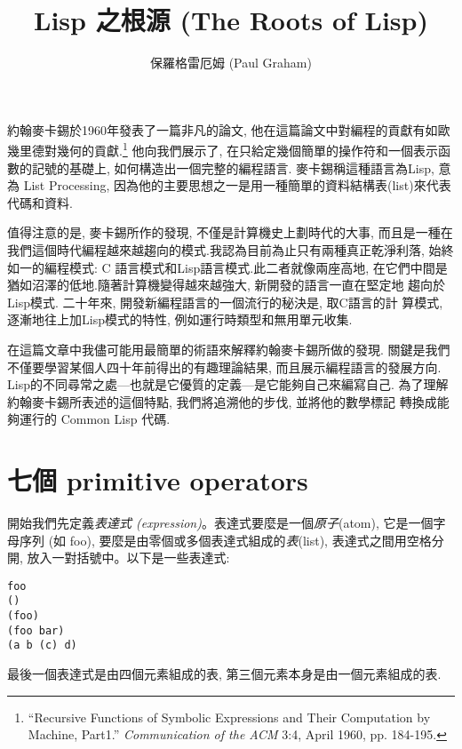 \documentclass[12pt]{article}
\begin{document}
 
\begin{CJK}{UTF8}{bsmi} %
\title{Lisp 之根源 (The Roots of Lisp)} 
\author{保羅格雷厄姆 (Paul Graham)} 
\maketitle 
\newcommand{\pone}{$p_{1}$} 
\newcommand{\pn}{$p_{n}$} 
\newcommand{\aone}{$a_{1}$} 
\newcommand{\an}{$a_{n}$} 
\newcommand{\vone}{$v_{1}$} 
\newcommand{\vn}{$v_{n}$} 
\newcommand{\eone}{$e_{1}$} 
\newcommand{\en}{$e_{n}$} 
約翰麥卡錫於1960年發表了一篇非凡的論文,
他在這篇論文中對編程的貢獻有如歐幾里德對幾何的貢獻.\footnote{``Recursive
Functions of Symbolic Expressions and Their Computation by Machine, Part1.'' 
{\it Communication of the ACM} 3:4, April 1960, pp. 184-195.} 
他向我們展示了, 在只給定幾個簡單的操作符和一個表示函數的記號的基礎上, 
如何構造出一個完整的編程語言. 
麥卡錫稱這種語言為Lisp, 
意為 
List 
Processing, 
因為他的主要思想之一是用一種簡單的資料結構表(list)來代表代碼和資料. 

值得注意的是, 麥卡錫所作的發現, 不僅是計算機史上劃時代的大事, 
而且是一種在我們這個時代編程越來越趨向的模式.我認為目前為止只有兩種真正乾淨利落, 
始終如一的編程模式: C 語言模式和Lisp語言模式.此二者就像兩座高地, 
在它們中間是猶如沼澤的低地.隨著計算機變得越來越強大, 新開發的語言一直在堅定地 
趨向於Lisp模式. 
二十年來, 開發新編程語言的一個流行的秘決是, 取C語言的計 
算模式, 逐漸地往上加Lisp模式的特性, 例如運行時類型和無用單元收集. 

在這篇文章中我儘可能用最簡單的術語來解釋約翰麥卡錫所做的發現. 
關鍵是我們不僅要學習某個人四十年前得出的有趣理論結果, 
而且展示編程語言的發展方向. 
Lisp的不同尋常之處---也就是它優質的定義---是它能夠自己來編寫自己. 
為了理解約翰麥卡錫所表述的這個特點, 我們將追溯他的步伐, 並將他的數學標記 
轉換成能夠運行的 Common Lisp 代碼. 

\section{七個 primitive operators} 
開始我們先定義{\em 表達式 (expression)}。表達式要麼是一個{\em 原子}(atom),
它是一個字母序列 (如 foo), 要麼是由零個或多個表達式組成的{\em 表}(list), 
表達式之間用空格分開, 放入一對括號中。以下是一些表達式: 
\begin{verbatim} 
foo 
() 
(foo) 
(foo bar) 
(a b (c) d) 
\end{verbatim} 
最後一個表達式是由四個元素組成的表, 
第三個元素本身是由一個元素組成的表. 


\end{CJK}
\end{document}
